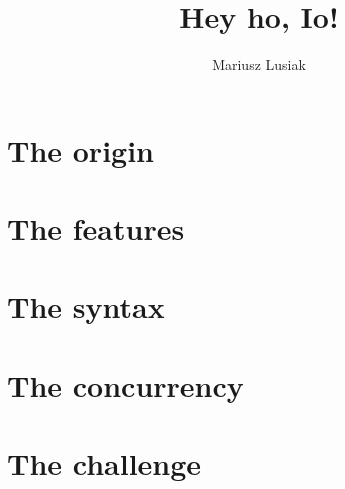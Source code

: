 \documentclass{beamer}
\title[Io]{Hey ho, Io!}
\author{Mariusz Lusiak}
\institute{applicake.com}
\begin{document}
  
  \section{}
  
    \begin{frame}
      \titlepage
    \end{frame}
  
    \begin{frame}
      \tableofcontents[hideallsubsections]
    \end{frame}
  
  \section{The origin}
  
  
  \section{The features}
  
  
  \section{The syntax}
  
  
  \section{The concurrency} %
  \label{sec:the_concurrency}
  
  
  \section{The challenge} %
  \label{sec:the_challenge}
  
    
\end{document}
